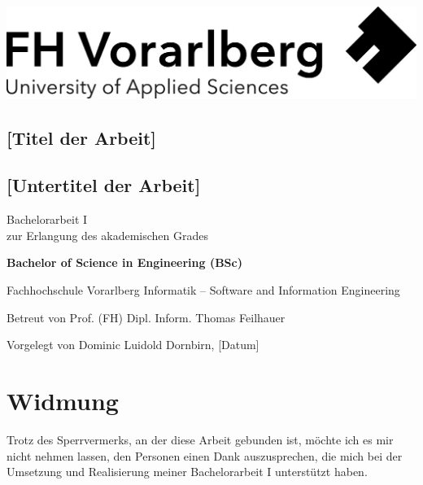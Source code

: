 \documentclass[a4paper,12pt,twoside]{scrreprt}
\begin{document}
\cleardoublepage   %
\thispagestyle{empty}
\begin{titlepage}
    \begin{flushright}
    \includegraphics[width=0.4\linewidth]{images/Logo_FHV.jpg}
    \end{flushright}
    \begin{flushleft}
    \section*{[Titel der Arbeit]}
    \subsection*{[Untertitel der Arbeit]}
    \vspace{1cm}

    Bachelorarbeit I\\
    zur Erlangung des akademischen Grades
    \vspace{0.5cm}

    \textbf{Bachelor of Science in Engineering (BSc)}

    \vspace{1cm}
    Fachhochschule Vorarlberg\newline
    Informatik – Software and Information Engineering

    \vspace{0.5cm}

    Betreut von\newline
    Prof. (FH) Dipl. Inform. Thomas Feilhauer

    \vspace{0.5cm}

    Vorgelegt von\newline
    Dominic Luidold\newline
    Dornbirn, [Datum]
    \end{flushleft}
\end{titlepage}

\newpage
\section*{Widmung}
\label{sec:widmung}
Trotz des Sperrvermerks, an der diese Arbeit gebunden ist, möchte ich es mir nicht nehmen lassen, den Personen einen Dank auszusprechen, die mich bei der Umsetzung und Realisierung meiner Bachelorarbeit I unterstützt haben.
\end{document}
